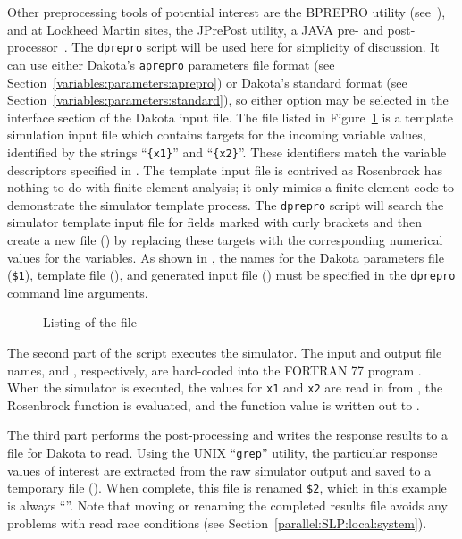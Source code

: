 Other preprocessing tools of potential interest are the BPREPRO
utility (see~\cite{WalXX}), and at Lockheed Martin sites, the JPrePost 
utility, a JAVA pre- and post-processor~\cite{Fla}. The \texttt{dprepro} script
will be used here for simplicity of discussion. It can use either 
Dakota's \texttt{aprepro} parameters file format (see
Section~\ref{variables:parameters:aprepro}) or Dakota's standard
format (see Section~\ref{variables:parameters:standard}), so either
option may be selected in the interface section of the Dakota input
file. The  file listed in
Figure~\ref{advint:figure04} is a template simulation input file which
contains targets for the incoming variable values, identified by the
strings ``\texttt{\{x1\}}'' and ``\texttt{\{x2\}}''. These
identifiers match the variable descriptors specified in
. The template input file is contrived
as Rosenbrock has nothing to do with finite element analysis; it only
mimics a finite element code to demonstrate the simulator
template process. The \texttt{dprepro} script will search the
simulator template input file for fields marked with curly
brackets and then create a new file () by replacing
these targets with the corresponding numerical values for the
variables. As shown in , the names for the Dakota
parameters file (\texttt{\$1}), template file
(), and generated input file ()
must be specified in the \texttt{dprepro} command line arguments.

\begin{figure}
  \centering
  \begin{bigbox}
    \begin{small}
    \end{small}
  \end{bigbox}
  \caption{Listing of the \protect{} file}
  \label{advint:figure04}
\end{figure}

The second part of the script executes the 
simulator. The input and output file names,  and
, respectively, are hard-coded into the FORTRAN 77
program . When the 
simulator is executed, the values for \texttt{x1} and \texttt{x2} are
read in from , the Rosenbrock function is evaluated,
and the function value is written out to .

The third part performs the post-processing and writes the response
results to a file for Dakota to read. Using the UNIX ``\texttt{grep}'' utility, the
particular response values of interest are extracted from the raw
simulator output and saved to a temporary file ().
When complete, this file is renamed \texttt{\$2}, which in this
example is always ``''.
Note that moving or renaming the completed results file
avoids any problems with read race
conditions (see Section~\ref{parallel:SLP:local:system}).

